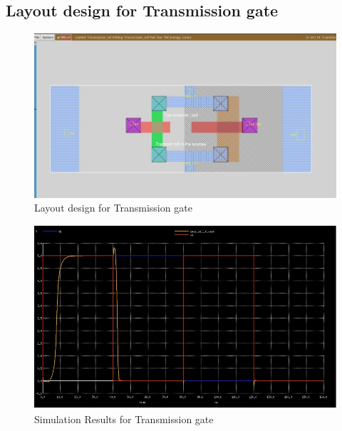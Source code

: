 \documentclass[12pt,a4paper]{article}
\begin{document}
\begin{center}
\subsection{Layout design for Transmission gate}
\vspace{15pt}
\begin{figure}[h]
\centering
\includegraphics[scale=.6]{trans1.jpg}
\caption[Short]{Layout design for Transmission gate }
\end{figure}


\vspace{10pt}
\begin{figure}[h]
\centering
\includegraphics[scale=.6]{trans2.jpg}
\caption[Short]{Simulation Results for Transmission gate}
\end{figure}

\clearpage

\end{center}
\end{document}
